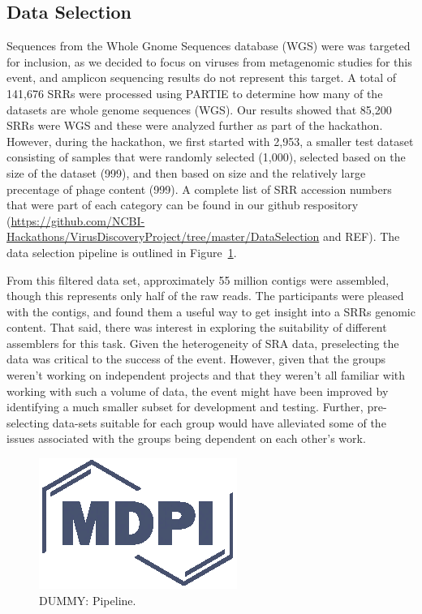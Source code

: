 \documentclass[genes, moreauthors]{Definitions/mdpi}
\begin{document}
  \subsection{Data Selection}
  Sequences from the Whole Gnome Sequences database (WGS) were was targeted for
  inclusion, as we decided to focus on viruses from metagenomic studies for
  this event, and amplicon sequencing results do not represent this target. A
  total of 141,676 SRRs were processed using PARTIE \cite{Torres2017} to
  determine how many of the datasets are whole genome sequences (WGS). Our
  results showed that 85,200 SRRs were WGS and these were analyzed further as
  part of the hackathon. However, during the hackathon, we first started with
  2,953, a smaller test dataset consisting of samples that were randomly
  selected (1,000), selected based on the size of the dataset (999), and then
  based on size and the relatively large precentage of phage content (999). A
  complete list of SRR accession numbers that were part of each category can be
  found in our github respository
  (\url{https://github.com/NCBI-Hackathons/VirusDiscoveryProject/tree/master/DataSelection}
  and REF). The data selection pipeline is outlined in
  Figure~\ref{fig:data_selection_pipeline}.

  From this filtered data set, approximately 55 million contigs were assembled,
  though this represents only half of the raw reads. The participants were
  pleased with the contigs, and found them a useful way to get insight into a
  SRRs genomic content. That said, there was interest in exploring the
  suitability of different assemblers for this task. Given the heterogeneity of
  SRA data, preselecting the data was critical to the success of the event.
  However, given that the groups weren't working on independent projects and
  that they weren't all familiar with working with such a volume of data, the
  event might have been improved by identifying a much smaller subset for
  development and testing. Further, pre-selecting data-sets suitable for each
  group would have alleviated some of the issues associated with the groups
  being dependent on each other's work.

  \begin{figure}[h]
    \centering
    \includegraphics{Definitions/logo-mdpi}
    \caption{DUMMY: Pipeline.
            \label{fig:data_selection_pipeline}}
  \end{figure}
\end{document}
